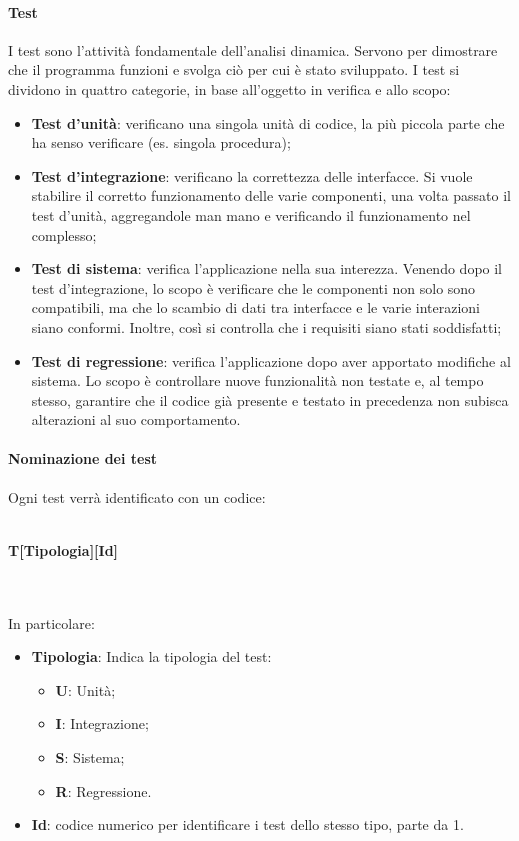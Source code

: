 \paragraph{Test}
I test sono l'attività fondamentale dell'analisi dinamica. Servono per dimostrare che il programma funzioni e svolga ciò per cui è stato sviluppato. I test si dividono in quattro categorie, in base all'oggetto in verifica e allo scopo: 
\begin{itemize}
\item \textbf{Test d'unità}: verificano una singola unità di codice, la più piccola parte che ha senso verificare (es. singola procedura);
\item \textbf{Test d'integrazione}: verificano la correttezza delle interfacce. Si vuole stabilire il corretto funzionamento delle varie componenti, una volta passato il test d'unità, aggregandole man mano e verificando il funzionamento nel complesso;
\item \textbf{Test di sistema}: verifica l'applicazione nella sua interezza. Venendo dopo il test d'integrazione, lo scopo è verificare che le componenti non solo sono compatibili, ma che lo scambio di dati tra interfacce e le varie interazioni siano conformi. Inoltre, così si controlla che i requisiti siano stati soddisfatti;
\item \textbf{Test di regressione}: verifica l'applicazione dopo aver apportato modifiche al sistema. Lo scopo è controllare nuove funzionalità non testate e, al tempo stesso, garantire che il codice già presente e testato in precedenza non subisca alterazioni al suo comportamento.
\end{itemize}

\paragraph{Nominazione dei test}
Ogni test verrà identificato con un codice: \\ \\
\centerline{\textbf{T[Tipologia][Id]}} \\ \\
In particolare:
\begin{itemize}
\item \textbf{Tipologia}: Indica la tipologia del test:
	\begin{itemize}
	\item \textbf{U}: Unità;
	\item \textbf{I}: Integrazione;
	\item \textbf{S}: Sistema;
	\item \textbf{R}: Regressione.
	\end{itemize}

\item \textbf{Id}: codice numerico per identificare i test dello stesso tipo, parte da 1.

\end{itemize}


